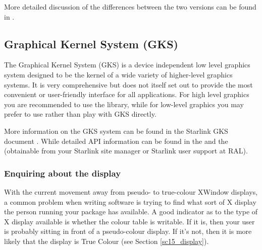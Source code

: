 \documentclass[twoside,11pt]{starlink}
\begin{document}
\begin{terminalv}
\end{terminalv}

More detailed discussion of the differences between the two versions
can be found in .

\subsection{Graphical Kernel System (GKS)\label{sc15_gks}}

The Graphical Kernel System (GKS) is a device independent low level
graphics system designed to be the kernel of a wide variety of
higher-level graphics systems. It is very comprehensive but does not
itself set out to provide the most convenient or user-friendly
interface for all applications. For high level graphics you are
recommended to use the  library, while
for low-level graphics you may prefer to use 
rather than play with GKS directly.

More information on the GKS system can be found in the Starlink GKS
document . While detailed API information can be
found in the 
and the 
(obtainable from your Starlink site manager or Starlink user support
at RAL).



\subsubsection{Enquiring about the display}

With the current movement away from pseudo- to true-colour XWindow
displays, a common problem when writing software is trying to find
what sort of X display the person running your package has available.
A good indicator as to the type of X display available is whether the
colour table is writable. If it is, then your user is probably sitting
in front of a pseudo-colour display. If it's not, then it is more
likely that the display is True Colour (see Section
\ref{sc15_display}).
\end{document}

